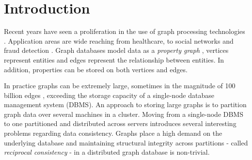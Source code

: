 \documentclass[sigplan,10pt]{acmart}
\begin{document}





\maketitle

\section{Introduction}
\label{sec:introduction}

Recent years have seen a proliferation in the use of graph processing technologies \cite{Besta2019}. Application areas are wide reaching from healthcare, to social networks and fraud detection \cite{Eifrem2016}. Graph databases model data as a \textit{property graph} \cite{Robinson2015}, vertices represent entities and edges represent the relationship between entities. In addition, properties can be stored on both vertices and edges.

In practice graphs can be extremely large, sometimes in the magnitude of 100 billion edges \cite{Sahu2017}, exceeding the storage capacity of a single-node database management system (DBMS). An approach to storing large graphs is to partition graph data over several machines in a cluster. Moving from a single-node DBMS to one partitioned and distributed across servers introduces several interesting problems regarding data consistency. Graphs place a high demand on the underlying database and maintaining structural integrity across partitions - called \textit{reciprocal consistency} - in a distributed graph database is non-trivial.
\end{document}
